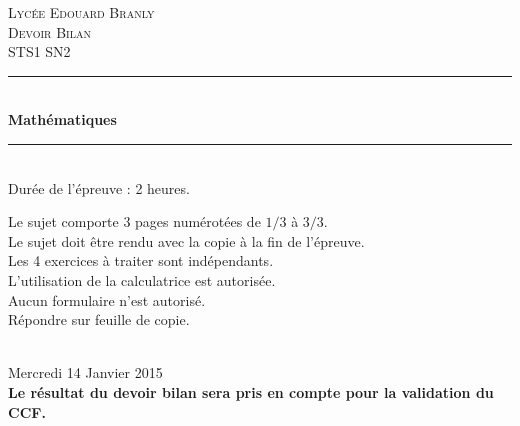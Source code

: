 \documentclass[12pt]{article}
\begin{document}
\begin{titlepage}

  \newcommand{\HRule}{\rule{\linewidth}{0.5mm}} %

  \center %
  
  \textsc{\LARGE Lycée Edouard Branly}\\[1.5cm] %
  
  \textsc{\Large Devoir Bilan}\\[0.5cm] %

  \textsc{\large STS1 SN2}\\[0.5cm] %

  \HRule \\[0.4cm]

  { \huge \bfseries Mathématiques}\\[0.4cm] %
  
  \HRule\\[2cm]

  {\huge Durée de l'épreuve : 2 heures.}\\[1.5cm]
  
  \begin{minipage}{0.8\textwidth}
    \begin{flushleft} \large
      Le sujet comporte $3$  pages numérotées de   $1/3$   à  $3/3$.\\
      Le sujet doit être rendu avec la copie à la fin de l’épreuve.\\
      Les 4 exercices à traiter sont indépendants.\\
      L'utilisation de la calculatrice est autorisée.\\
      Aucun formulaire n'est autorisé.\\
      Répondre sur feuille de copie.\\
    \end{flushleft}
  \end{minipage}\\[4cm]

  {\huge Mercredi 14 Janvier 2015}\\[3cm] 

  {\textbf{Le résultat du devoir bilan sera pris en compte pour la validation du CCF.}}

  \vfill %

\end{titlepage}
\newpage
\end{document}
